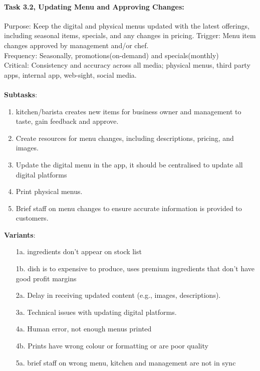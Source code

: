 \documentclass{article}
\begin{document}
\paragraph{Task 3.2, Updating Menu and Approving Changes:}
Purpose: Keep the digital and physical menus updated with the latest offerings, including seasonal items, specials, and any changes in pricing.
Trigger: Menu item changes approved by management and/or chef.\\
Frequency: Seasonally, promotions(on-demand) and specials(monthly)\\
Critical: Consistency and accuracy across all media; physical menus, third party apps, internal app, web-sight, social media.\\
\\
\textbf{Subtasks}:
\begin{enumerate}
    \item kitchen/barista creates new items for business owner and management to taste, gain feedback and approve.
    \item Create resources for menu changes, including descriptions, pricing, and images.
    \item Update the digital menu in the app, it should be centralised to update all digital platforms
    \item Print physical menus.
    \item Brief staff on menu changes to ensure accurate information is provided to customers.
\end{enumerate}
\textbf{Variants}:
\begin{enumerate}
    \item [1a.] ingredients don't appear on stock list
    \item [1b.] dish is to expensive to produce, uses premium ingredients that don't have good profit margins
    \item [2a.] Delay in receiving updated content (e.g., images, descriptions).
    \item [3a.] Technical issues with updating digital platforms.
    \item [4a.] Human error, not enough menus printed
    \item [4b.] Prints have wrong colour or formatting or are poor quality
    \item [5a.] brief staff on wrong menu, kitchen and management are not in sync
\end{enumerate}
\end{document}
